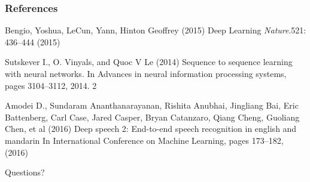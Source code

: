 \documentclass{beamer}
\begin{document}
\begin{frame}
\frametitle{References}
\footnotesize{
\begin{thebibliography}{99} 
 Bengio, Yoshua, LeCun, Yann, Hinton Geoffrey (2015)
\newblock Deep Learning
\newblock \emph{Nature}.521: 436–444 (2015)

 Sutskever I., O. Vinyals, and Quoc V Le (2014)
\newblock Sequence to sequence learning with neural networks.
\newblock In Advances in neural information processing systems, pages 3104–3112, 2014. 2

Amodei D., Sundaram Ananthanarayanan, Rishita Anubhai, Jingliang Bai, Eric Battenberg, Carl Case, Jared Casper, Bryan Catanzaro, Qiang Cheng, Guoliang Chen, et al (2016)
\newblock Deep speech 2: End-to-end speech recognition in english and mandarin
\newblock In International Conference on Machine Learning, pages 173–182, (2016)

\end{thebibliography}
}
\end{frame}

\begin{frame}
\Huge{\centerline{Questions?}}
\end{frame}
\end{document}
